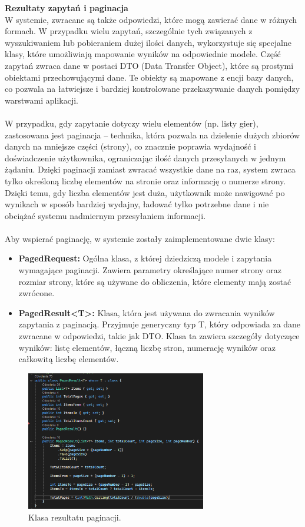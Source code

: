 \documentclass[12pt,a4paper]{article}
\begin{document}
\noindent \textbf{Rezultaty zapytań i paginacja}\\
W systemie, zwracane są także odpowiedzi, które mogą zawierać dane w różnych formach. W przypadku wielu zapytań, szczególnie tych związanych z wyszukiwaniem lub pobieraniem dużej ilości danych, wykorzystuje się specjalne klasy, które umożliwiają mapowanie wyników na odpowiednie modele. Część zapytań zwraca dane w postaci DTO (Data Transfer Object), które są prostymi obiektami przechowującymi dane. Te obiekty są mapowane z encji bazy danych, co pozwala na łatwiejsze i bardziej kontrolowane przekazywanie danych pomiędzy warstwami aplikacji.
\\\\
W przypadku, gdy zapytanie dotyczy wielu elementów (np. listy gier), zastosowana jest paginacja – technika, która pozwala na dzielenie dużych zbiorów danych na mniejsze części (strony), co znacznie poprawia wydajność i doświadczenie użytkownika, ograniczając ilość danych przesyłanych w jednym żądaniu. Dzięki paginacji zamiast zwracać wszystkie dane na raz, system zwraca tylko określoną liczbę elementów na stronie oraz informację o numerze strony. Dzięki temu, gdy liczba elementów jest duża, użytkownik może nawigować po wynikach w sposób bardziej wydajny, ładować tylko potrzebne dane i nie obciążać systemu nadmiernym przesyłaniem informacji.
\\\\
Aby wspierać paginację, w systemie zostały zaimplementowane dwie klasy:
\begin{itemize}
    \item \textbf{PagedRequest:} Ogólna klasa, z której dziedziczą modele i zapytania wymagające paginacji. Zawiera parametry określające numer strony oraz rozmiar strony, które są używane do obliczenia, które elementy mają zostać zwrócone.
    \item \textbf{PagedResult<T>:} Klasa, która jest używana do zwracania wyników zapytania z paginacją. Przyjmuje generyczny typ T, który odpowiada za dane zwracane w odpowiedzi, takie jak DTO. Klasa ta zawiera szczegóły dotyczące wyników: listę elementów, łączną liczbę stron, numerację wyników oraz całkowitą liczbę elementów.
\end{itemize}

\begin{figure}[h!]
    \centering
    \includegraphics[width=0.7\textwidth]{images/ex_pagination.png}
    \caption{Klasa rezultatu paginacji.}
\end{figure}
\end{document}
